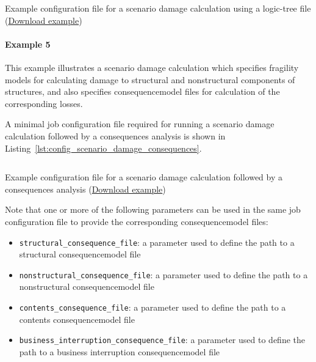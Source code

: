 \begin{listing}[htbp]
  \inputminted[firstline=1,firstnumber=1,fontsize=\footnotesize,frame=single,linenos,bgcolor=lightgray,label=job\_hazard.ini]{ini}{oqum/risk/verbatim/config_scenario_hazard_gmlt.ini}
  \caption{Example configuration file for a scenario damage calculation using a logic-tree file (\href{https://raw.githubusercontent.com/GEMScienceTools/oq-engine-docs/master/oqum/risk/verbatim/config_scenario_hazard_gmlt.xml}{Download example})}
  \label{lst:config_scenario_hazard_gmlt}
\end{listing}


\paragraph{Example 5}

This example illustrates a scenario damage calculation which specifies
fragility models for calculating damage to structural and nonstructural
components of structures, and also specifies \gls{consequencemodel} files for
calculation of the corresponding losses.

A minimal job configuration file required for running a scenario damage
calculation followed by a consequences analysis is shown in
Listing~\ref{lst:config_scenario_damage_consequences}.

\begin{listing}[htbp]
  \inputminted[firstline=1,firstnumber=1,fontsize=\footnotesize,frame=single,linenos,bgcolor=lightgray,label=job.ini]{ini}{oqum/risk/verbatim/config_scenario_damage_consequences.ini}
  \caption{Example configuration file for a scenario damage calculation followed by a consequences analysis (\href{https://raw.githubusercontent.com/GEMScienceTools/oq-engine-docs/master/oqum/risk/verbatim/config_scenario_damage_consequences.xml}{Download example})}
  \label{lst:config_scenario_damage_consequences}
\end{listing}

Note that one or more of the following parameters can be used in the same job
configuration file to provide the corresponding \gls{consequencemodel} files:

\begin{itemize}

  \item \Verb+structural_consequence_file+: a parameter used to define the path
    to a structural \gls{consequencemodel} file

  \item \Verb+nonstructural_consequence_file+: a parameter used to define the path
    to a nonstructural \gls{consequencemodel} file

  \item \Verb+contents_consequence_file+: a parameter used to define the path
    to a contents \gls{consequencemodel} file

  \item \Verb+business_interruption_consequence_file+: a parameter used to define
    the path to a business interruption \gls{consequencemodel} file

\end{itemize}

